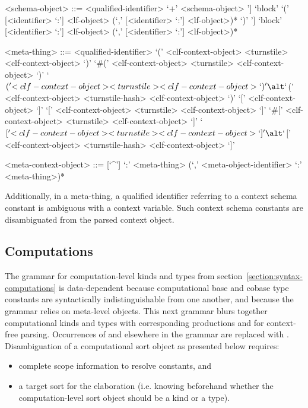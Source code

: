 \begin{grammar}
<schema-object> ::= <qualified-identifier>
 `+' <schema-object>
\alt [`some' `[' <identifier> `:' <lf-object> (`,' <identifier> `:' <lf-object>)* `]'] `block' `(' [<identifier> `:'] <lf-object> (`,' [<identifier> `:'] <lf-object>)* `)'
\alt [`some' `[' <identifier> `:' <lf-object> (`,' <identifier> `:' <lf-object>)* `]'] `block' [<identifier> `:'] <lf-object> (`,' [<identifier> `:'] <lf-object>)*

<meta-thing> ::= <qualified-identifier>
\alt `(' <clf-context-object> <turnstile> <clf-context-object> `)'
\alt `#(' <clf-context-object> <turnstile> <clf-context-object> `)'
\alt `$(' <clf-context-object> <turnstile> <clf-context-object> `)'
\alt `$(' <clf-context-object> <turnstile-hash> <clf-context-object> `)'
\alt `[' <clf-context-object> `]'
\alt `[' <clf-context-object> <turnstile> <clf-context-object> `]'
\alt `#[' <clf-context-object> <turnstile> <clf-context-object> `]'
\alt `$[' <clf-context-object> <turnstile> <clf-context-object> `]'
\alt `$[' <clf-context-object> <turnstile-hash> <clf-context-object> `]'

<meta-context-object> ::= [`^']
 `:' <meta-thing> (`,' <meta-object-identifier> `:' <meta-thing>)*
\end{grammar}

Additionally, in a meta-thing, a qualified identifier referring to a context schema constant is ambiguous with a context variable.
Such context schema constants are disambiguated from the parsed context object.

\subsection{Computations}

The grammar for computation-level kinds and types from section~\ref{section:syntax-computations} is data-dependent because computational base and cobase type constants are syntactically indistinguishable from one another, and because the grammar relies on meta-level objects.
This next grammar blurs together computational kinds and types with corresponding productions  and  for context-free parsing.
Occurrences of  and  elsewhere in the grammar are replaced with .
Disambiguation of a computational sort object as presented below requires:
\begin{itemize}
\item complete scope information to resolve constants, and
\item a target sort for the elaboration (i.e. knowing beforehand whether the computation-level sort object should be a kind or a type).
\end{itemize}

